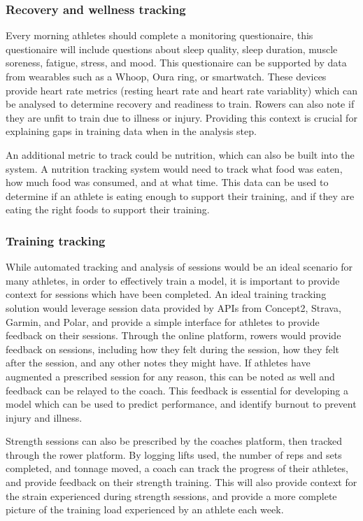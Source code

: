 \subsubsection{Recovery and wellness tracking}
Every morning athletes should complete a monitoring questionaire, this questionaire will include questions about sleep quality, sleep duration, muscle soreness, fatigue, stress, and mood. This questionaire can be supported by data from wearables such as a Whoop, Oura ring, or smartwatch. These devices provide heart rate metrics (resting heart rate and heart rate variablity) which can be analysed to determine recovery and readiness to train. Rowers can also note if they are unfit to train due to illness or injury. Providing this context is crucial for explaining gaps in training data when in the analysis step.

An additional metric to track could be nutrition, which can also be built into the system. A nutrition tracking system would need to track what food was eaten, how much food was consumed, and at what time. This data can be used to determine if an athlete is eating enough to support their training, and if they are eating the right foods to support their training.

\subsubsection{Training tracking}
While automated tracking and analysis of sessions would be an ideal scenario for many athletes, in order to effectively train a model, it is important to provide context for sessions which have been completed. An ideal training tracking solution would leverage session data provided by APIs from Concept2, Strava, Garmin, and Polar, and provide a simple interface for athletes to provide feedback on their sessions. Through the online platform, rowers would provide feedback on sessions, including how they felt during the session, how they felt after the session, and any other notes they might have. If athletes have augmented a prescribed session for any reason, this can be noted as well and feedback can be relayed to the coach. This feedback is essential for developing a model which can be used to predict performance, and identify burnout to prevent injury and illness.

Strength sessions can also be prescribed by the coaches platform, then tracked through the rower platform. By logging lifts used, the number of reps and sets completed, and tonnage moved, a coach can track the progress of their athletes, and provide feedback on their strength training. This will also provide context for the strain experienced during strength sessions, and provide a more complete picture of the training load experienced by an athlete each week.


